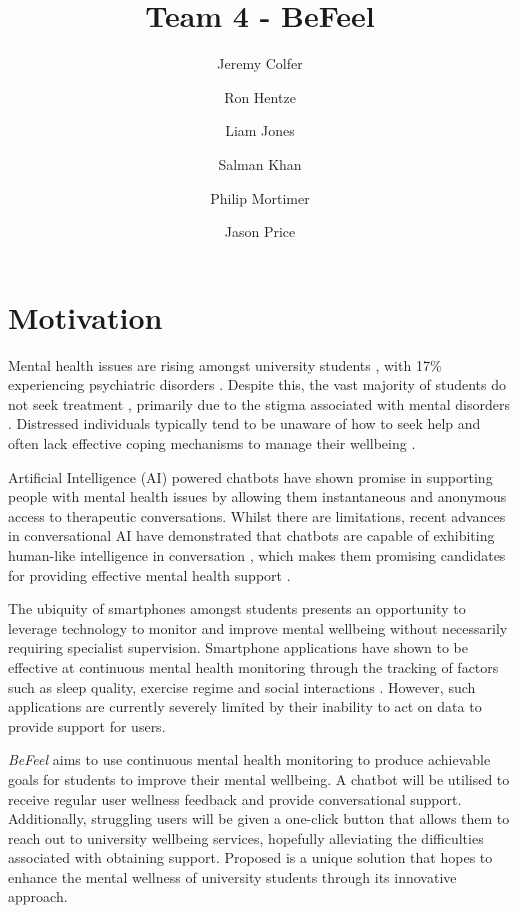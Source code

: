 \documentclass[acmsmall, screen, nonacm, 9pt, a4paper,top=2cm,bottom=2cm,left=1cm,right=1cm, marginparwidth=1cm]{acmart}
\title{Team 4 - BeFeel}
\author{Jeremy Colfer}
\author{Ron Hentze}
\author{Liam Jones}
\author{Salman Khan}
\author{Philip Mortimer}
\author{Jason Price}
\begin{document}
\maketitle
\pagestyle{plain}


\section{Motivation}
Mental health issues are rising amongst university students \cite{Storrie2010AProblem}, with 17\% experiencing psychiatric disorders \cite{Macaskill2013TheKingdom}. Despite this, the vast majority of students do not seek treatment \cite{Macaskill2013TheKingdom,Blanco2008MentalPeers}, primarily due to the stigma associated with mental disorders \cite{MichaelN.Sharpe2004TheEducation}. Distressed individuals typically tend to be unaware of how to seek help and often lack effective coping mechanisms to manage their wellbeing \cite{Rosenthal2008MentalStudents}.

Artificial Intelligence (AI) powered chatbots have shown promise in supporting people with mental health issues by allowing them instantaneous and anonymous access to therapeutic conversations\cite{Grove2021Co-developingPeople}. Whilst there are limitations, recent advances in conversational AI have demonstrated that chatbots are capable of exhibiting human-like intelligence in conversation \cite{Bubeck2023SparksGPT-4}, which makes them promising candidates for providing effective mental health support \cite{Pham2022ArtificialPsychiatry}.

The ubiquity of smartphones amongst students \cite{OfcomSmartphoneStatista} presents an opportunity to leverage technology to monitor and improve mental wellbeing without necessarily requiring specialist supervision. Smartphone applications have shown to be effective at continuous mental health monitoring through the tracking of factors such as sleep quality, exercise regime and social interactions \cite{Wang2014StudentLife,Wang2022First-GenLens}. However, such applications are currently severely limited by their inability to act on data to provide support for users.

\emph{BeFeel} aims to use continuous mental health monitoring to produce achievable goals for students to improve their mental wellbeing. A chatbot will be utilised to receive regular user wellness feedback and provide conversational support. Additionally, struggling users will be given a one-click button that allows them to reach out to university wellbeing services, hopefully alleviating the difficulties associated with obtaining support. Proposed is a unique solution that hopes to enhance the mental wellness of university students through its innovative approach.
\end{document}
